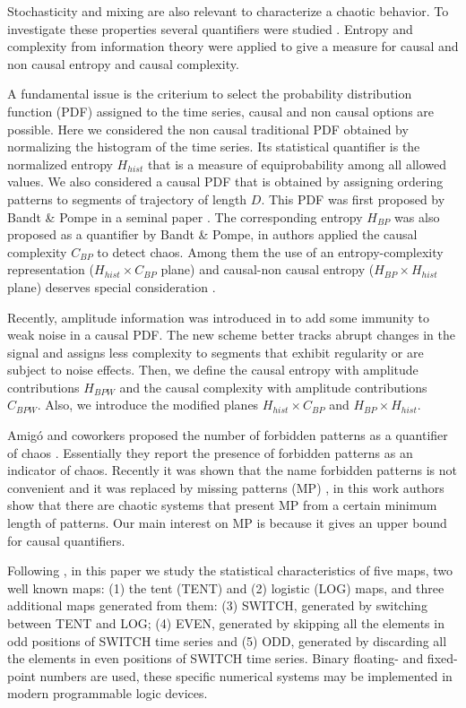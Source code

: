 Stochasticity and mixing are also relevant to characterize a chaotic behavior.
To investigate these properties several quantifiers were studied \cite{DeMicco2009}.
Entropy and complexity from information theory were applied to give a measure for causal and non causal entropy and causal complexity.

A fundamental issue is the criterium to select the probability distribution function (PDF) assigned to the time series, causal and non causal options are possible.
Here we considered the non causal traditional PDF obtained by normalizing the histogram of the time series.
Its statistical quantifier is the normalized entropy $H_{hist}$ that is a measure of equiprobability among all allowed values.
We also considered a causal PDF that is obtained by assigning ordering patterns to segments of trajectory of length $D$.
This PDF was first proposed by Bandt \& Pompe in a seminal paper \cite{Bandt2002}.
The corresponding entropy $H_{BP}$ was also proposed as a quantifier by Bandt \& Pompe, in \cite{Rosso2007} authors applied the causal complexity $C_{BP}$ to detect chaos.
Among them the use of an entropy-complexity representation ($H_{hist} \times C_{BP}$ plane) and causal-non causal entropy ($H_{BP} \times H_{hist}$ plane) deserves special consideration \cite{DeMicco2009,Rosso2007,Fouda2017,DeMicco2008,DeMicco2012,Rosso2010,Antonelli2017}.

Recently, amplitude information was introduced in \cite{Fadlallah2013} to add some immunity to weak noise in a causal PDF.
The new scheme better tracks abrupt changes in the signal and assigns less complexity to segments that exhibit regularity or are subject to noise effects.
Then, we define the causal entropy with amplitude contributions $H_{BPW}$ and the causal complexity with amplitude contributions $C_{BPW}$.
Also, we introduce the modified planes $H_{hist} \times C_{BP}$ and $H_{BP} \times H_{hist}$.

Amig\'o and coworkers proposed the number of forbidden patterns as a quantifier of chaos \cite{Amigo2007a}.
Essentially they report the presence of forbidden patterns as an indicator of chaos.
Recently it was shown that the name forbidden patterns is not convenient and it was replaced by missing patterns (MP) \cite{Rosso2012}, in this work authors show that there are chaotic systems that present MP from a certain minimum length of patterns.
Our main interest on MP is because it gives an upper bound for causal quantifiers.

Following \cite{Nagaraj2008}, in this paper we study the statistical characteristics of five maps, two well known maps: (1) the tent (TENT) and (2) logistic (LOG) maps, and three additional maps generated from them: (3) SWITCH, generated by switching between TENT and LOG; (4) EVEN, generated by skipping all the elements in odd positions of SWITCH time series and (5) ODD, generated by discarding all the elements in even positions of SWITCH time series.
Binary floating- and fixed-point numbers are used, these specific numerical systems may be implemented in modern programmable logic devices.

